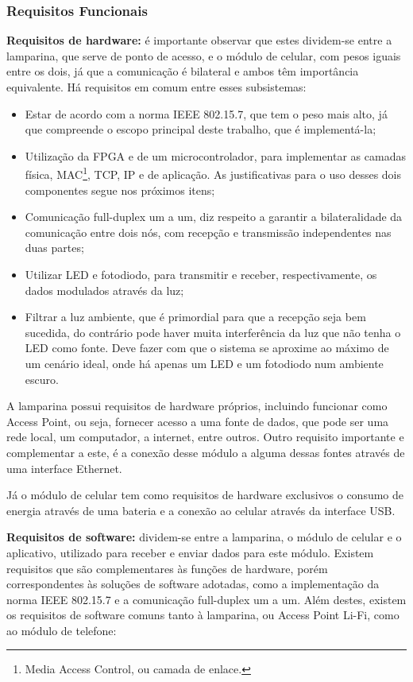 	\subsubsection{Requisitos Funcionais}\label{subsubsec-requisitos-func}
	\textbf{Requisitos de hardware:} é importante observar que estes dividem-se entre a lamparina, que serve de ponto de acesso, e o módulo de celular, com pesos iguais entre os dois, já que a comunicação é bilateral e ambos têm importância equivalente. Há requisitos em comum entre esses subsistemas:
	\begin{itemize}  
		\item Estar de acordo com a norma IEEE 802.15.7, que tem o peso mais alto, já que compreende o escopo principal deste trabalho, que é implementá-la;
		\item Utilização da FPGA e de um microcontrolador, para implementar as camadas física, MAC\footnote{ Media Access Control, ou camada de enlace.},  TCP, IP e de aplicação. As justificativas para o uso desses dois componentes segue nos próximos itens;
		\item Comunicação full-duplex um a um, diz respeito a garantir a bilateralidade da comunicação entre dois nós, com recepção e transmissão independentes nas duas partes;
		\item Utilizar LED e fotodiodo, para transmitir e receber, respectivamente, os dados modulados através da luz;
		\item Filtrar a luz ambiente, que é primordial para que a recepção seja bem sucedida, do contrário pode haver muita interferência da luz que não tenha o LED como fonte. Deve fazer com que o sistema se aproxime ao máximo de um cenário ideal, onde há apenas um LED e um fotodiodo num ambiente escuro.
	\end{itemize}
	
	A lamparina possui requisitos de hardware próprios, incluindo funcionar como Access Point, ou seja, fornecer acesso a uma fonte de dados, que pode ser uma rede local, um computador, a internet, entre outros. Outro requisito importante e complementar a este, é a conexão desse módulo a alguma dessas fontes através de uma interface Ethernet.
	
	Já o módulo de celular tem como requisitos de hardware exclusivos o consumo de energia através de uma bateria e a conexão ao celular através da interface USB.	
	
	\textbf{Requisitos de software:} dividem-se entre a lamparina, o módulo de celular e o aplicativo, utilizado para receber e enviar dados para este módulo. Existem requisitos que são complementares às funções de hardware, porém correspondentes às soluções de software adotadas, como a implementação da norma IEEE 802.15.7 e a comunicação full-duplex um a um. Além destes, existem os requisitos de software comuns tanto à lamparina, ou Access Point Li-Fi, como ao módulo de telefone:
	
